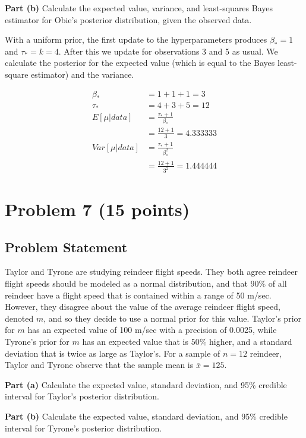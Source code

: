 \documentclass[12pt]{article}
\theoremstyle{definition}
\begin{document}
\bigskip
\noindent
{\bf Part (b)} Calculate the expected value, variance, and least-squares Bayes estimator for Obie's posterior distribution, given the observed data.


With a uniform prior, the first update to the hyperparameters produces $\beta_* = 1$ and $\tau_* = k = 4$. After this we update for observations 3 and 5 as usual.
We calculate the posterior for the expected value (which is equal to the Bayes least-square estimator) and the variance.

\begin{align*}
\beta_* &= 1 + 1 + 1 = 3\\
\tau_* &= 4 + 3 + 5 = 12\\
E[\mu|data] &= \frac{\tau_* + 1}{\beta_*}\\
&= \frac{12 + 1}{3} = 4.333333\\
Var[\mu|data] &= \frac{\tau_* + 1}{\beta_*^2}\\
&= \frac{12 + 1}{3^2} = 1.444444
\end{align*}






\newpage
\section*{Problem 7 (15 points)}

\subsection*{Problem Statement}

Taylor and Tyrone are studying reindeer flight speeds. They both agree reindeer flight speeds should be modeled as a normal distribution, and that 90\% of all reindeer have a flight speed that is contained within a range of 50 m/sec. However, they disagree about the value of the average reindeer flight speed, denoted $m$, and so they decide to use a normal prior for this value. Taylor's prior for $m$ has an expected value of 100 m/sec with a precision of 0.0025, while Tyrone's prior for $m$ has an expected value that is $50\%$ higher, and a standard deviation that is twice as large as Taylor's. For a sample of $n = 12$ reindeer, Taylor and Tyrone observe that the sample mean is $\overline{x} = 125$.

\bigskip
\noindent
{\bf Part (a)} Calculate the expected value, standard deviation, and 95\% credible interval for Taylor's posterior distribution.

\bigskip
\noindent
{\bf Part (b)} Calculate the expected value, standard deviation, and 95\% credible interval for Tyrone's posterior distribution.
\end{document}

